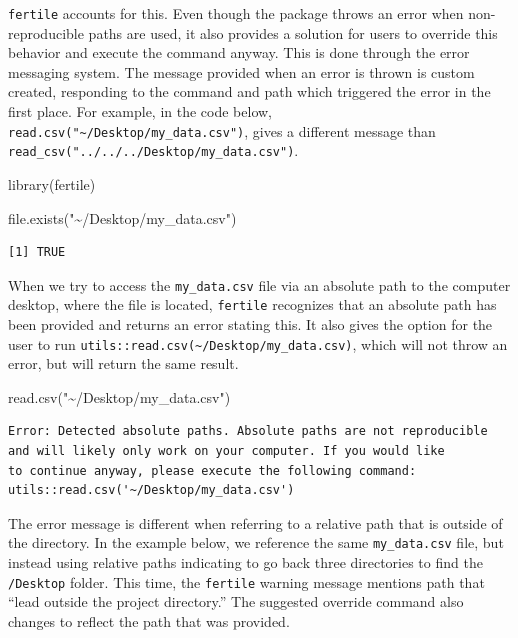 \documentclass[12pt,twoside]{reedthesis}
\newenvironment{Shaded}{\begin{snugshade}}{\end{snugshade}}
\newcommand{\FunctionTok}[1]{\textcolor[rgb]{0.00,0.00,0.00}{#1}}
\newcommand{\NormalTok}[1]{#1}
\newcommand{\StringTok}[1]{\textcolor[rgb]{0.31,0.60,0.02}{#1}}
\begin{document}
\texttt{fertile} accounts for this. Even though the package throws an error when non-reproducible paths are used, it also provides a solution for users to override this behavior and execute the command anyway. This is done through the error messaging system. The message provided when an error is thrown is custom created, responding to the command and path which triggered the error in the first place. For example, in the code below, \texttt{read.csv("\textasciitilde{}/Desktop/my\_data.csv")}, gives a different message than \texttt{read\_csv("../../../Desktop/my\_data.csv")}.
\begin{Shaded}
\begin{Highlighting}[]
\FunctionTok{library}\NormalTok{(fertile)}
\end{Highlighting}
\end{Shaded}
\begin{Shaded}
\begin{Highlighting}[]
\FunctionTok{file.exists}\NormalTok{(}\StringTok{"\textasciitilde{}/Desktop/my\_data.csv"}\NormalTok{)}
\end{Highlighting}
\end{Shaded}
\begin{verbatim}
[1] TRUE
\end{verbatim}
When we try to access the \texttt{my\_data.csv} file via an absolute path to the computer desktop, where the file is located, \texttt{fertile} recognizes that an absolute path has been provided and returns an error stating this. It also gives the option for the user to run \texttt{utils::read.csv(\textquotesingle{}\textasciitilde{}/Desktop/my\_data.csv\textquotesingle{})}, which will not throw an error, but will return the same result.
\begin{Shaded}
\begin{Highlighting}[]
\FunctionTok{read.csv}\NormalTok{(}\StringTok{"\textasciitilde{}/Desktop/my\_data.csv"}\NormalTok{)}
\end{Highlighting}
\end{Shaded}
\begin{verbatim}
Error: Detected absolute paths. Absolute paths are not reproducible
and will likely only work on your computer. If you would like
to continue anyway, please execute the following command:
utils::read.csv('~/Desktop/my_data.csv')
\end{verbatim}
The error message is different when referring to a relative path that is outside of the directory. In the example below, we reference the same \texttt{my\_data.csv} file, but instead using relative paths indicating to go back three directories to find the \texttt{/Desktop} folder. This time, the \texttt{fertile} warning message mentions path that ``lead outside the project directory.'' The suggested override command also changes to reflect the path that was provided.
\end{document}
